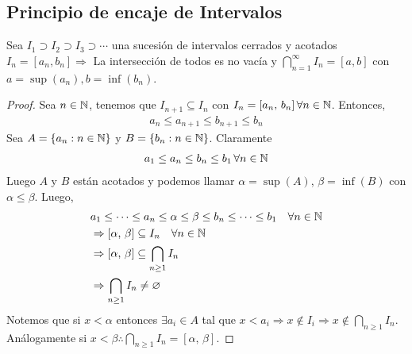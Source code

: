 \subsection{Principio de encaje de Intervalos}

\begin{theorem}
    Sea \(I_1 \supset I_2 \supset I_3 \supset \cdots \) una sucesión de intervalos cerrados y acotados \(I_n = [a_n, b_n] \Rightarrow \)
    La intersección de todos es no vacía y \(\bigcap_{n=1}^{\infty} I_n = [a,b]\) con \(a = \sup(a_n), b=\inf(b_n)\).
    \begin{proof}
        Sea \(n \in \mathbb{N} \), tenemos que \(I_{n+1} \subseteq I_n\) con \(I_n = [a_n\text{, } b_n] \, \forall n \in \mathbb{N} \). Entonces, \begin{align*}
            a_n \leq a_{n+1} \leq b_{n+1} \leq b_n
        \end{align*}
        Sea \(A = \{ a_n : n \in \mathbb{N} \} \) y \(B = \{ b_n : n \in \mathbb{N} \} \). Claramente \begin{align*}
            a_1 \leq a_n \leq b_n \leq b_1 \, \forall n \in \mathbb{N}
        \end{align*}
        Luego \(A\) y \(B\) están acotados y podemos llamar \(\alpha = \sup(A)\), \(\beta = \inf(B)\) con \(\alpha \leq \beta \). Luego, \begin{align*}
             & a_1 \leq \cdots \leq a_n \leq \alpha \leq \beta \leq b_n \leq \cdots \leq b_1 \quad \forall n \in \mathbb{N} \\
             & \Rightarrow [\alpha\text{, }\beta] \subseteq I_n \quad \forall n \in \mathbb{N}                              \\
             & \Rightarrow [\alpha\text{, }\beta] \subseteq \bigcap_{n \geq 1} I_n                                  \\
             & \Rightarrow \bigcap_{n \geq 1} I_n \neq \varnothing
        \end{align*}
        Notemos que si \(x < \alpha \) entonces \(\exists a_i \in A\) tal que \(x < a_i \Rightarrow x \notin I_i \Rightarrow x \notin \bigcap_{n \geq 1} I_n\).
        Análogamente si \(x < \beta \therefore \bigcap_{n \geq 1} I_n = [\alpha\text{, }\beta]\).
    \end{proof}
\end{theorem}


